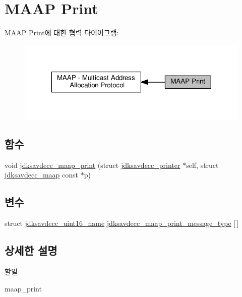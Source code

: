 \hypertarget{group__maap__print}{}\section{M\+A\+AP Print}
\label{group__maap__print}
M\+A\+AP Print에 대한 협력 다이어그램\+:
\nopagebreak
\begin{figure}[H]
\begin{center}
\leavevmode
\includegraphics[width=317pt]{group__maap__print}
\end{center}
\end{figure}
\subsection*{함수}
\begin{DoxyCompactItemize}
\item 
void \hyperlink{group__maap__print_ga899740505230fe4b1d956de028abad49}{jdksavdecc\+\_\+maap\+\_\+print} (struct \hyperlink{structjdksavdecc__printer}{jdksavdecc\+\_\+printer} $\ast$self, struct \hyperlink{structjdksavdecc__maap}{jdksavdecc\+\_\+maap} const $\ast$p)
\end{DoxyCompactItemize}
\subsection*{변수}
\begin{DoxyCompactItemize}
\item 
struct \hyperlink{structjdksavdecc__uint16__name}{jdksavdecc\+\_\+uint16\+\_\+name} \hyperlink{group__maap__print_ga1f5dd2597dc39232da1f2dfbb975bf25}{jdksavdecc\+\_\+maap\+\_\+print\+\_\+message\+\_\+type} \mbox{[}$\,$\mbox{]}
\end{DoxyCompactItemize}


\subsection{상세한 설명}
\begin{DoxyRefDesc}{할일}
\item[\hyperlink{todo__todo000014}{할일}]maap\+\_\+print \end{DoxyRefDesc}


